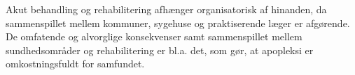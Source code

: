 Akut behandling og rehabilitering afhænger organisatorisk af hinanden, da sammenspillet mellem kommuner, sygehuse og praktiserende læger er afgørende. %
De omfatende og alvorglige konsekvenser samt sammenspillet mellem sundhedsområder og rehabilitering er bl.a. det, som gør, at apopleksi er omkostningsfuldt for samfundet.\cite{Sundhedsstyrelsen2010} \\

